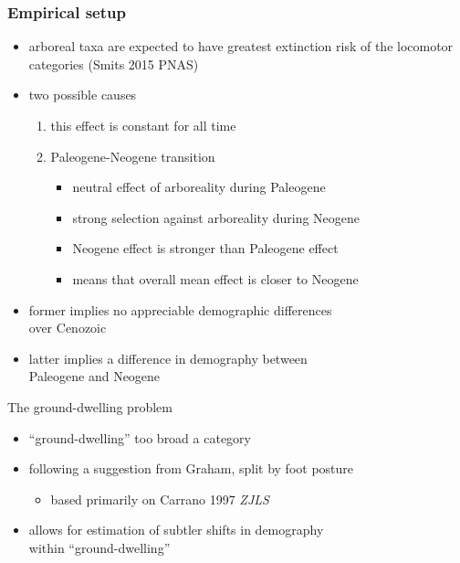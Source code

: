 \documentclass{beamer}
\begin{document}
\begin{frame}
  \frametitle{Empirical setup}
  \begin{itemize}
    \item arboreal taxa are expected to have greatest extinction risk of the locomotor categories (Smits 2015 PNAS)
    \item two possible causes
      \begin{enumerate}
        \item this effect is constant for all time
        \item Paleogene-Neogene transition
          \begin{itemize}
            \item neutral effect of arboreality during Paleogene
            \item strong selection against arboreality during Neogene
            \item Neogene effect is stronger than Paleogene effect
            \item means that overall mean effect is closer to Neogene
          \end{itemize}
      \end{enumerate}
    \item former implies no appreciable demographic differences \\over Cenozoic
    \item latter implies a difference in demography between \\Paleogene and Neogene
  \end{itemize}
\end{frame}

\begin{frame}
  \begin{block}{The ground-dwelling problem}
    \begin{itemize}
      \item ``ground-dwelling'' too broad a category
      \item following a suggestion from Graham, split by foot posture
        \begin{itemize}
          \item based primarily on Carrano 1997 \textit{ZJLS}
        \end{itemize}
      \item allows for estimation of subtler shifts in demography \\within ``ground-dwelling''
    \end{itemize}
  \end{block}
\end{frame}
\end{document}
